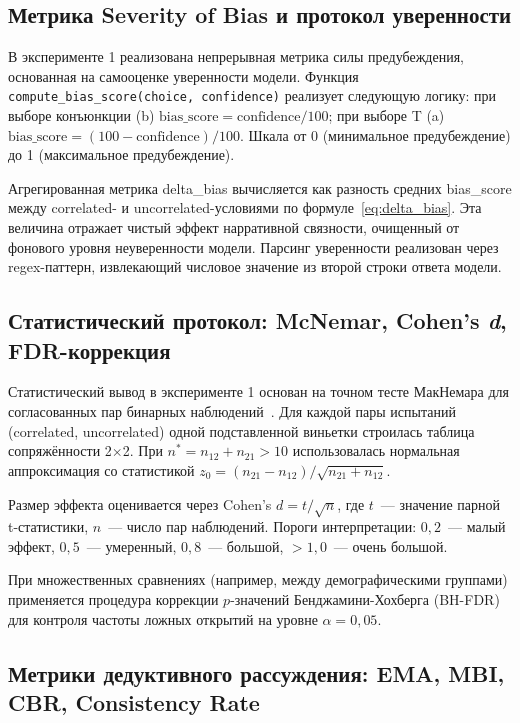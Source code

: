 \subsection{Метрика Severity of Bias и протокол уверенности}

В эксперименте 1 реализована непрерывная метрика силы предубеждения, основанная на самооценке уверенности модели. Функция \texttt{compute\_bias\_score(choice, confidence)} реализует следующую логику: при выборе конъюнкции (b) $\text{bias\_score} = \text{confidence} / 100$; при выборе T (a) $\text{bias\_score} = (100 - \text{confidence}) / 100$. Шкала от 0 (минимальное предубеждение) до 1 (максимальное предубеждение).

Агрегированная метрика delta\_bias вычисляется как разность средних bias\_score между correlated- и uncorrelated-условиями по формуле~\eqref{eq:delta_bias}. Эта величина отражает чистый эффект нарративной связности, очищенный от фонового уровня неуверенности модели. Парсинг уверенности реализован через regex-паттерн, извлекающий числовое значение из второй строки ответа модели.

\subsection{Статистический протокол: McNemar, Cohen's \textit{d}, FDR-коррекция}

Статистический вывод в эксперименте 1 основан на точном тесте МакНемара для согласованных пар бинарных наблюдений~\cite{mcnemar1947note}. Для каждой пары испытаний (correlated, uncorrelated) одной подставленной виньетки строилась таблица сопряжённости 2$\times$2. При $n^* = n_{12} + n_{21} > 10$ использовалась нормальная аппроксимация со статистикой $z_0 = (n_{21} - n_{12}) / \sqrt{n_{21} + n_{12}}$.

Размер эффекта оценивается через Cohen's $d = t / \sqrt{n}$, где $t$~--- значение парной t-статистики, $n$~--- число пар наблюдений. Пороги интерпретации: $0{,}2$~--- малый эффект, $0{,}5$~--- умеренный, $0{,}8$~--- большой, $>1{,}0$~--- очень большой.

При множественных сравнениях (например, между демографическими группами) применяется процедура коррекции $p$-значений Бенджамини-Хохберга (BH-FDR)~\cite{benjamini1995controlling} для контроля частоты ложных открытий на уровне $\alpha = 0{,}05$.

\subsection{Метрики дедуктивного рассуждения: EMA, MBI, CBR, Consistency Rate}

